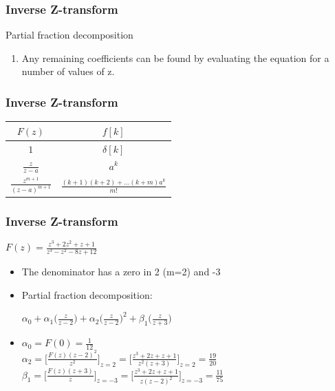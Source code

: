\begin{frame}
	\frametitle{Inverse Z-transform}
	\begin{block}{Partial fraction decomposition}
			\begin{enumerate}
				\setcounter{enumi}{\theenumTmp}
				\item Any remaining coefficients can be found by evaluating the equation for a number of values of z.
			\end{enumerate}
	\end{block}

\end{frame}
\begin{frame}
	\frametitle{Inverse Z-transform}
	\begin{tabular}{|c|c|}
		\hline $F(z)$ & $f[k]$ \\
		\hline $1$ & $\delta[k]$ \\
		\hline $\frac{z}{z-a}$ & $ a^{k}$ \\
		\hline $\frac{z^{m+1}}{(z-a)^{m+1}}$ & $\frac{(k+1)(k+2)+ \dots (k+m)a^{k}}{m!}$ \\ 
		\hline 
	\end{tabular} 
\end{frame}
\begin{frame}
	\frametitle{Inverse Z-transform}
	\begin{example}
		\footnotesize{
		\begin{center}
			$F(z) = \frac{z^3 + 2 z^2 + z +1}{z^3-z^2-8z +12}$
		\end{center}
		\vspace{-1.5 em}
		\begin{itemize}
			\item The denominator has a zero in 2 (m=2) and -3
			\item Partial fraction decomposition:
			\begin{center}
				$\alpha_0 +\alpha_1 \bigg(\frac{z}{z-2}\bigg)+ \alpha_2 \bigg(\frac{z}{z-2}\bigg)^{2} + \beta_1 \bigg(\frac{z}{z+3}\bigg)$
			\end{center}
			
			\item \begin{center}
				$\alpha_0 = F(0) = \frac{1}{12} $ \\
				$\alpha_2 =\Bigg[\frac{F(z)(z-2)^{2}}{z^2}\Bigg]_{z=2} = \Bigg[\frac{z^3+2z+z+1}{z^2(z+3)}\Bigg]_{z=2} = \frac{19}{20}$\\
				$\beta_1 =\Bigg[\frac{F(z)(z+3)}{z}\Bigg]_{z=-3} = \Bigg[\frac{z^3+2z+z+1}{z(z-2)^2}\Bigg]_{z=-3} = \frac{11}{75}$ 
			\end{center}
		
		\end{itemize}}
	\end{example}
\end{frame}
